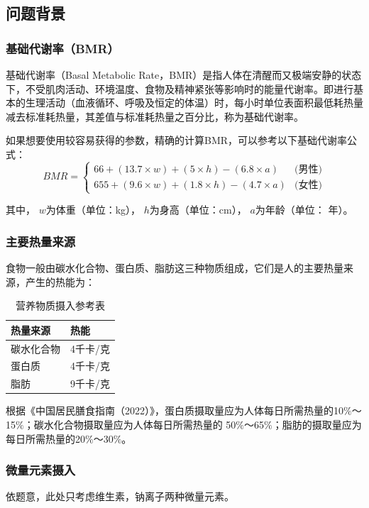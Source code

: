 \documentclass{SYSUReport}
\begin{document}
\subsection{问题背景}
\subsubsection{基础代谢率（BMR）}
基础代谢率（Basal Metabolic Rate，BMR）是指人体在清醒而又极端安静的状态下，不受肌肉活动、环境温度、食物及精神紧张等影响时的能量代谢率。即进行基本的生理活动（血液循环、呼吸及恒定的体温）时，每小时单位表面积最低耗热量减去标准耗热量，其差值与标准耗热量之百分比，称为基础代谢率。

如果想要使用较容易获得的参数，精确的计算BMR，可以参考以下基础代谢率公式：
\begin{equation*}
    BMR = \begin{cases} 
66 + (13.7 \times w) + (5 \times h) - (6.8 \times a) & \text{(男性)} \\
655 + (9.6 \times w) + (1.8 \times h) - (4.7 \times a) & \text{(女性)}
\end{cases}
\end{equation*}

其中， $w$为体重（单位：kg）， $h$为身高（单位：cm）， $a$为年龄（单位： 年）。

\subsubsection{主要热量来源}
食物一般由碳水化合物、蛋白质、脂肪这三种物质组成，它们是人的主要热量来源，产生的热能为：

\begin{table}[h!]
\centering
\renewcommand\arraystretch{0.65}
\begin{tabular}{ll}
\toprule
		热量来源  & 热能   \\ \midrule
		碳水化合物 & 4千卡/克  \\
		蛋白质   & 4千卡/克  \\
		脂肪    & 9千卡/克  \\ 
\bottomrule
\end{tabular}
\caption{营养物质摄入参考表}
\label{heat-table}
\end{table}
根据《中国居民膳食指南（2022）》，蛋白质摄取量应为人体每日所需热量的10$\%$～15$\%$；碳水化合物摄取量应为人体每日所需热量的 50$\%$～65$\%$；脂肪的摄取量应为每日所需热量的20$\%$～30$\%$。

\subsubsection{微量元素摄入}
依题意，此处只考虑维生素，钠离子两种微量元素。
\end{document}
